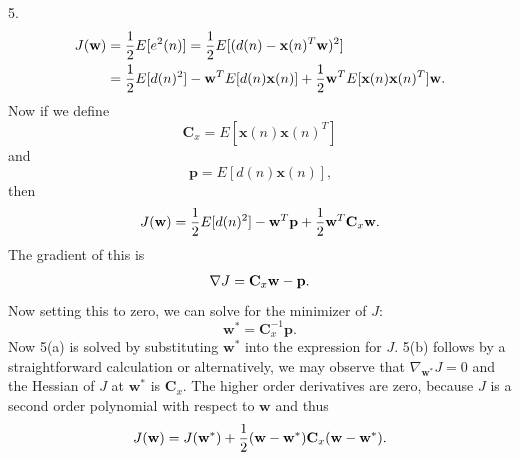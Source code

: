 \documentclass[10pt]{article}
\newcommand{\vw}{{\bf{w}}}
\begin{document}
5. 
\begin{align*}
J(\vw)&=\frac{1}{2}E[e^2(n)]=\frac{1}{2}E[(d(n)-\mathbf{x}(n)^T\vw)^2] \\
&=
\frac{1}{2} E[d(n)^2] - \vw^T E[ d(n) \mathbf{x}(n)  ]  + 
\frac{1}{2} \vw^T E[\textbf{x}(n) \textbf{x}(n)^T ] \vw \mbox{.}
\end{align*}
%
Now if we define 
\begin{equation*}
\textbf{C}_x = E[\textbf{x}(n) \textbf{x}(n)^T ]
\end{equation*}
and
\begin{equation*}
\textbf{p} = E[d(n) \textbf{x}(n) ] \mbox{,}
\end{equation*}
then
\begin{align*}
J(\vw) = \frac{1}{2} E[d(n)^2] - \vw^T \textbf{p}  + 
\frac{1}{2} \vw^T \textbf{C}_x \vw \mbox{.}
\end{align*}
%
The gradient of this is
\begin{align*}
\nabla J =   \textbf{C}_x \vw - \textbf{p} \mbox{.}
\end{align*}
%
Now setting this to zero, we can solve for the minimizer of $J$:
\begin{equation*}
\textbf{w}^* = \textbf{C}_x^{-1} \textbf{p} \mbox{.}
\end{equation*}
Now 5(a) is solved by substituting $\textbf{w}^*$ into the expression for $J$.
5(b) follows by a straightforward calculation or alternatively, we may observe
that $\nabla_{\textbf{w}^*} J = 0$ and the Hessian of $J$ at $\textbf{w}^*$ is $\textbf{C}_x$.
The higher order derivatives are zero, because $J$ is a second order polynomial with respect
to $\textbf{w}$ and thus
\begin{equation*}
J(\vw) = J( \textbf{w}^* ) + \frac{1}{2} ( \vw - \textbf{w}^* ) \textbf{C}_x ( \vw - \textbf{w}^* ) \mbox{.}
\end{equation*}
\end{document}
